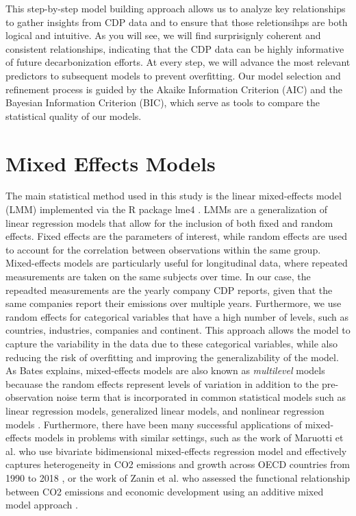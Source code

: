This step-by-step model building approach allows us to analyze key relationships to gather insights from CDP data and to ensure that those reletionsihps are both logical and intuitive. As you will see, we will find surprisignly coherent and consistent relationships, indicating that the CDP data can be highly informative of future decarbonization efforts. At every step, we will advance the most relevant predictors to subsequent models to prevent overfitting. Our model selection and refinement process is guided by the Akaike Information Criterion (AIC) and the Bayesian Information Criterion (BIC), which serve as tools to compare the statistical quality of our models.

\section{Mixed Effects Models}

The main statistical method used in this study is the linear mixed-effects model (LMM) implemented via the R package lme4 \cite{lmer}. LMMs are a generalization of linear regression models that allow for the inclusion of both fixed and random effects. Fixed effects are the parameters of interest, while random effects are used to account for the correlation between observations within the same group. Mixed-effects models are particularly useful for longitudinal data, where repeated measurements are taken on the same subjects over time. In our case, the repeadted measurements are the yearly company CDP reports, given that the same companies report their emissions over multiple years. Furthermore, we use random effects for categorical variables that have a high number of levels, such as countries, industries, companies and continent. This approach allows the model to capture the variability in the data due to these categorical variables, while also reducing the risk of overfitting and improving the generalizability of the model. As Bates explains, mixed-effects models are also known as \textit{multilevel} models becauase the random effects represent levels of variation in addition to the pre-observation noise term that is incorporated in common statistical models such as linear regression models, generalized linear models, and nonlinear regression models \cite{bates}. Furthermore, there have been many successful applications of mixed-effects models in problems with similar settings, such as the work of Maruotti et al. who use bivariate bidimensional mixed-effects regression model and effectively captures heterogeneity in CO2 emissions and growth across OECD countries from 1990 to 2018 \cite{Maruotti2023CO2}, or the work of Zanin et al. who assessed the functional relationship between CO2 emissions and economic development using an additive mixed model approach \cite{zanin}.

